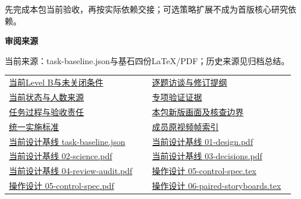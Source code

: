 \documentclass[11pt,a4paper]{article}
\newcommand{\reviewsubsection}[1]{\par\Needspace{4\baselineskip}\vspace{4pt}\begin{center}{\titlelatin\titlecjk\bfseries\fontsize{12}{18}\selectfont #1}\end{center}}
\begin{document}
先完成本包当前验收，再按实际依赖交接；可选策略扩展不成为首版核心研究依赖。


\begin{minipage}{\linewidth}
\reviewsubsection{3.4 审阅来源}
当前来源：task-\allowbreak{}baseline.json与基石四份LaTeX/\allowbreak{}PDF；历史来源见归档总结。


\begingroup\small\setlength{\tabcolsep}{4pt}\begin{tabular}{@{}p{0.48\linewidth}p{0.48\linewidth}@{}}
\href{file:///D:/Agent/srp/agent/tasks/Q-02/outputs/current-level-b.md}{当前Level B与未关闭条件} & \href{file:///D:/Agent/srp/agent/tasks/Q-02/outputs/interview-guide.md}{逐题访谈与修订提纲}\\[4pt]
\href{file:///D:/Agent/srp/agent/tasks/Q-02/outputs/current-level-b.json}{当前状态与人数来源} & \href{file:///D:/Agent/srp/agent/tasks/Q-02/evidence/verification.json}{专项验证证据}\\[4pt]
\href{file:///D:/Agent/srp/agent/tasks/Q-02/TASK.md}{任务过程与验收责任} & \href{file:///D:/Agent/srp/agent/tasks/Q-02/outputs/current-implementation-evidence.md}{本包新版画面及核查边界}\\[4pt]
\href{file:///D:/Agent/srp/agent/design/weather/2026-10-08_Storm\%E4\%B8\%8E\%E7\%BA\%AF\%E7\%B2\%92\%E5\%AD\%90\%E5\%8F\%8C\%E7\%8E\%AF\%E5\%AE\%9E\%E6\%96\%BD\%E6\%A0\%87\%E5\%87\%86.md}{统一实施标准} & \href{file:///D:/Agent/srp/human/assets/previews/2026-10-08/member-storm-particle-rings/frame-index.json}{成员原视频帧索引}\\[4pt]
\href{file:///D:/Agent/srp/agent/design/design-foundation-20261008/task-baseline.json}{当前设计基线 task-\allowbreak{}baseline.json} & \href{file:///D:/Agent/srp/agent/design/design-foundation-20261008/01-design.pdf}{当前设计基线 01-\allowbreak{}design.pdf}\\[4pt]
\href{file:///D:/Agent/srp/agent/design/design-foundation-20261008/02-science.pdf}{当前设计基线 02-\allowbreak{}science.pdf} & \href{file:///D:/Agent/srp/agent/design/design-foundation-20261008/03-decisions.pdf}{当前设计基线 03-\allowbreak{}decisions.pdf}\\[4pt]
\href{file:///D:/Agent/srp/agent/design/design-foundation-20261008/04-review-audit.pdf}{当前设计基线 04-\allowbreak{}review-\allowbreak{}audit.pdf} & \href{file:///D:/Agent/srp/agent/design/design-foundation-20261008/05-control-spec.tex}{操作设计 05-\allowbreak{}control-\allowbreak{}spec.tex}\\[4pt]
\href{file:///D:/Agent/srp/agent/design/design-foundation-20261008/05-control-spec.pdf}{操作设计 05-\allowbreak{}control-\allowbreak{}spec.pdf} & \href{file:///D:/Agent/srp/agent/design/design-foundation-20261008/06-paired-storyboards.tex}{操作设计 06-\allowbreak{}paired-\allowbreak{}storyboards.tex}\\[4pt]

\end{tabular}
\end{minipage}
\end{document}

